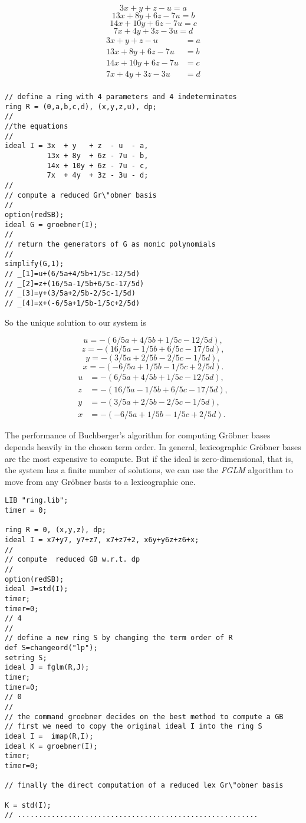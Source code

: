 \documentclass[12pt]{amsart}
\begin{document}
\ifx\shipout\UnDeFiNeD 
$$3x  + y   + z  - u  = a$$
$$13x + 8y  + 6z - 7u = b$$
$$14x + 10y + 6z - 7u = c$$
$$7x  + 4y  + 3z - 3u = d$$
\else 
\begin{align*}
3x  + y   + z  - u  &= a\\
13x + 8y  + 6z - 7u &= b\\
14x + 10y + 6z - 7u &= c\\ 
7x  + 4y  + 3z - 3u &= d\\
\end{align*}
\fi 

\begin{verbatim}
// define a ring with 4 parameters and 4 indeterminates
ring R = (0,a,b,c,d), (x,y,z,u), dp;
//
//the equations
//
ideal I = 3x  + y   + z  - u  - a,
          13x + 8y  + 6z - 7u - b,
          14x + 10y + 6z - 7u - c,
          7x  + 4y  + 3z - 3u - d;
//
// compute a reduced Gr\"obner basis
//
option(redSB);
ideal G = groebner(I);
//
// return the generators of G as monic polynomials
//
simplify(G,1);
// _[1]=u+(6/5a+4/5b+1/5c-12/5d)
// _[2]=z+(16/5a-1/5b+6/5c-17/5d)
// _[3]=y+(3/5a+2/5b-2/5c-1/5d)
// _[4]=x+(-6/5a+1/5b-1/5c+2/5d) 
\end{verbatim}

So the unique solution to our system is

\ifx\shipout\UnDeFiNeD 
$$u = -(6/5a+4/5b+1/5c-12/5d),$$
$$z = -(16/5a-1/5b+6/5c-17/5d),$$
$$y = -(3/5a+2/5b-2/5c-1/5d),$$
$$x = -(-6/5a+1/5b-1/5c+2/5d).$$
\else 
\begin{align*}
u &= -(6/5a+4/5b+1/5c-12/5d),\\
z &= -(16/5a-1/5b+6/5c-17/5d),\\
y &= -(3/5a+2/5b-2/5c-1/5d),\\
x &= -(-6/5a+1/5b-1/5c+2/5d).
\end{align*}
\fi 

The performance of Buchberger's algorithm for computing Gr\"obner bases depends
heavily in the chosen term order. In general, lexicographic Gr\"obner bases are the
most expensive to compute. But if the ideal is zero-dimensional, that is, 
the system has a finite number of solutions, we can use the \emph{FGLM} algorithm
to move from any Gr\"obner basis to a lexicographic one. 

\begin{verbatim}
LIB "ring.lib";
timer = 0;

ring R = 0, (x,y,z), dp;
ideal I = x7+y7, y7+z7, x7+z7+2, x6y+y6z+z6+x;
//
// compute  reduced GB w.r.t. dp
//
option(redSB);
ideal J=std(I);
timer;
timer=0;
// 4
//
// define a new ring S by changing the term order of R 
def S=changeord("lp");
setring S;
ideal J = fglm(R,J);
timer;
timer=0;
// 0
//
// the command groebner decides on the best method to compute a GB
// first we need to copy the original ideal I into the ring S
ideal I =  imap(R,I);
ideal K = groebner(I);
timer;
timer=0;

// finally the direct computation of a reduced lex Gr\"obner basis  

K = std(I);
// .........................................................
\end{verbatim}
\end{document}
